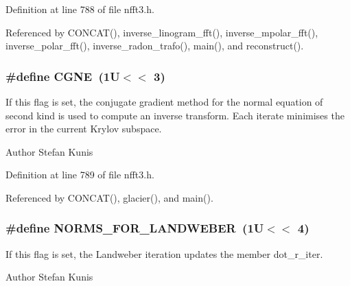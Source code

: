 Definition at line 788 of file nfft3.\-h.



Referenced by C\-O\-N\-C\-A\-T(), inverse\-\_\-linogram\-\_\-fft(), inverse\-\_\-mpolar\-\_\-fft(), inverse\-\_\-polar\-\_\-fft(), inverse\-\_\-radon\-\_\-trafo(), main(), and reconstruct().

\hypertarget{group__solver_gaae8290aa6a83fd56699a98cc0a55baf5}{
\subsubsection[{C\-G\-N\-E}]{\setlength{\rightskip}{0pt plus 5cm}\#define C\-G\-N\-E~(1\-U$<$$<$ 3)}}\label{group__solver_gaae8290aa6a83fd56699a98cc0a55baf5}
If this flag is set, the conjugate gradient method for the normal equation of second kind is used to compute an inverse transform. Each iterate minimises the error in the current Krylov subspace.

\begin{DoxyAuthor}{Author}
Stefan Kunis 
\end{DoxyAuthor}


Definition at line 789 of file nfft3.\-h.



Referenced by C\-O\-N\-C\-A\-T(), glacier(), and main().

\hypertarget{group__solver_ga6be0dda24e7cbd9f3f1d1b299e815973}{
\subsubsection[{N\-O\-R\-M\-S\-\_\-\-F\-O\-R\-\_\-\-L\-A\-N\-D\-W\-E\-B\-E\-R}]{\setlength{\rightskip}{0pt plus 5cm}\#define N\-O\-R\-M\-S\-\_\-\-F\-O\-R\-\_\-\-L\-A\-N\-D\-W\-E\-B\-E\-R~(1\-U$<$$<$ 4)}}\label{group__solver_ga6be0dda24e7cbd9f3f1d1b299e815973}
If this flag is set, the Landweber iteration updates the member dot\-\_\-r\-\_\-iter.

\begin{DoxyAuthor}{Author}
Stefan Kunis 
\end{DoxyAuthor}


